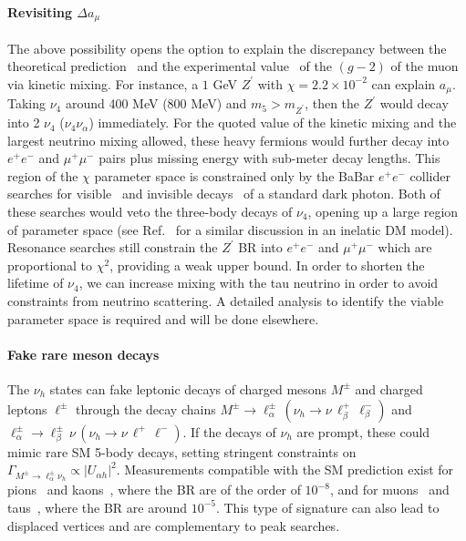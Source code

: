 \paragraph{Revisiting $\Delta a_\mu$} The above possibility opens the option to explain the discrepancy between the theoretical prediction~\cite{Blum:2018mom,*Keshavarzi:2018mgv} and the experimental value~\cite{Bennett:2006fi} of the $(g-2)$ of the muon via kinetic mixing. For instance, a $1$ GeV $Z^\prime$ with $\chi = 2.2\times10^{-2}$ can explain $a_\mu$. Taking $\nu_4$ around 400 MeV (800 MeV) and $m_5 > m_{Z^\prime}$, then the $Z^\prime$ would decay into 2 $\nu_4$ ($\nu_4 \nu_\alpha$) immediately. For the quoted value of the kinetic mixing and the largest neutrino mixing allowed, these heavy fermions would further decay into $e^+ e^-$ and $\mu^+ \mu^-$ pairs plus missing energy with sub-meter decay lengths.  This region of the $\chi$ parameter space is constrained only by the BaBar $e^+e^-$ collider searches for visible~\cite{Lees:2014xha} and invisible decays~\cite{Lees:2017lec} of a standard dark photon. Both of these searches would veto the three-body decays of $\nu_4$, opening up a large region of parameter space (see Ref.~\cite{Mohlabeng:2019vrz} for a similar discussion in an inelatic DM model). Resonance searches still constrain the $Z^\prime$ BR into $e^+ e^-$ and $\mu^+ \mu^-$ which are proportional to $\chi^2$, providing a weak upper bound. In order to shorten the lifetime of $\nu_4$, we can increase mixing with the tau neutrino in order to avoid constraints from neutrino scattering. A detailed analysis to identify the viable parameter space is required and will be done elsewhere.

\paragraph{Fake rare meson decays} The $\nu_h$ states can fake leptonic decays of charged mesons $M^\pm$ and charged leptons $\ell^\pm$ through the decay chains $M^\pm \to \ell^\pm_\alpha \, (\nu_h \to \nu\, \ell^+_\beta\, \ell^-_\beta)$ and $\ell^\pm_\alpha \to \ell^\pm_\beta\, \nu\, (\nu_h \to \nu\, \ell^+ \, \ell^-)$. If the decays of $\nu_h$ are prompt, these could mimic rare SM 5-body decays, setting stringent constraints on $\Gamma_{M^\pm \to \ell^\pm_\alpha \nu_h} \propto |U_{\alpha h}|^2$. Measurements compatible with the SM prediction exist for pions~\cite{Egli:1986nk,*Grab:1986si} and kaons~\cite{Poblaguev:2002ug,*Ma:2005iv,*Peruzzo:2017qis}, where the BR are of the order of $10^{-8}$, and for muons~\cite{Bertl:1985mw} and taus~\cite{Alam:1995mt}, where the BR are around $10^{-5}$. This type of signature can also lead to displaced vertices and are complementary to peak searches. 

